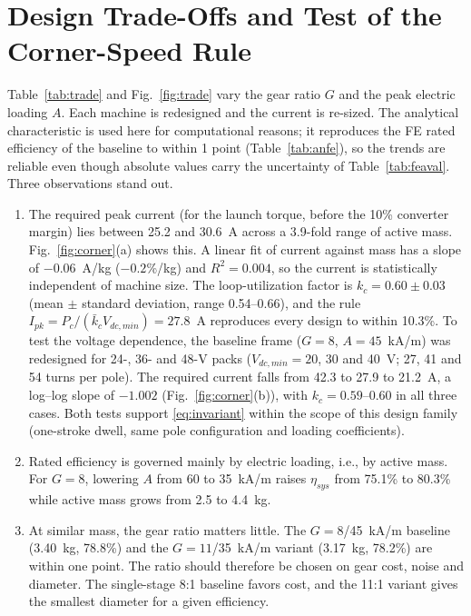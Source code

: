 \documentclass[journal]{IEEEtran}
\begin{document}
\section{Design Trade-Offs and Test of the Corner-Speed Rule}
\label{sec:trade}
Table~\ref{tab:trade} and Fig.~\ref{fig:trade} vary the gear ratio $G$ and the
peak electric loading $A$. Each machine is redesigned and the current is
re-sized. The analytical characteristic is used here for computational reasons;
it reproduces the FE rated efficiency of the baseline to within 1 point
(Table~\ref{tab:anfe}), so the trends are reliable even though absolute values
carry the uncertainty of Table~\ref{tab:feaval}. Three observations stand out.
\begin{enumerate}
\item The required peak current (for the launch torque, before the 10\%
converter margin) lies between 25.2 and 30.6~A across a 3.9-fold range of active
mass. Fig.~\ref{fig:corner}(a) shows this. A linear fit of current against mass
has a slope of $-0.06$~A/kg ($-0.2$\%/kg) and $R^2=0.004$, so the current is
statistically independent of machine size. The loop-utilization factor is
$k_c=0.60\pm0.03$ (mean $\pm$ standard deviation, range 0.54--0.66), and the rule
$I_{pk}=P_c/(\bar k_cV_{dc,min})=27.8$~A reproduces every design to within
10.3\%. To test the voltage dependence, the baseline frame ($G=8$,
$A=45$~kA/m) was redesigned for 24-, 36- and 48-V packs ($V_{dc,min}=20$, 30
and 40~V; 27, 41 and 54 turns per pole). The required current falls from 42.3
to 27.9 to 21.2~A, a log--log slope of $-1.002$ (Fig.~\ref{fig:corner}(b)), with
$k_c=0.59$--$0.60$ in all three cases. Both tests support \eqref{eq:invariant}
within the scope of this design family (one-stroke dwell, same pole
configuration and loading coefficients).
\item Rated efficiency is governed mainly by electric loading, i.e., by active
mass. For $G=8$, lowering $A$ from 60 to 35~kA/m raises $\eta_{sys}$ from 75.1\%
to 80.3\% while active mass grows from 2.5 to 4.4~kg.
\item At similar mass, the gear ratio matters little. The $G=8$/45~kA/m
baseline (3.40~kg, 78.8\%) and the $G=11$/35~kA/m variant (3.17~kg, 78.2\%)
are within one point. The ratio should therefore be chosen on gear cost, noise
and diameter. The single-stage 8:1 baseline favors cost, and the 11:1 variant
gives the smallest diameter for a given efficiency.
\end{enumerate}
\end{document}
